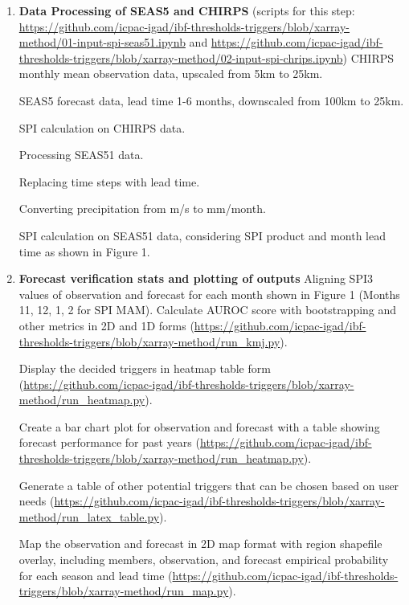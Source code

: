 \begin{enumerate}
	
	\item \textbf{Data Processing of SEAS5 and CHIRPS} (scripts for this step: \url{https://github.com/icpac-igad/ibf-thresholds-triggers/blob/xarray-method/01-input-spi-seas51.ipynb} and \url{https://github.com/icpac-igad/ibf-thresholds-triggers/blob/xarray-method/02-input-spi-chrips.ipynb})
	\subitem CHIRPS monthly mean observation data, upscaled from 5km to 25km. 
	
	\subitem SEAS5 forecast data, lead time 1-6 months, downscaled from 100km to 25km. 
	
	\subitem SPI calculation on CHIRPS data. 
	
	\subitem Processing SEAS51 data. 
	
	\subitem Replacing time steps with lead time. 
	
	\subitem Converting precipitation from m/s to mm/month. 
	
	\subitem SPI calculation on SEAS51 data, considering SPI product and month lead time as shown in Figure 1.
	
	\item \textbf{Forecast verification stats and plotting of outputs} 
	\subitem Aligning SPI3 values of observation and forecast for each month shown in Figure 1 (Months 11, 12, 1, 2 for SPI MAM). Calculate AUROC score with bootstrapping and other metrics in 2D and 1D forms (\url{https://github.com/icpac-igad/ibf-thresholds-triggers/blob/xarray-method/run_kmj.py}).
	
	\subitem Display the decided triggers in heatmap table form (\url{https://github.com/icpac-igad/ibf-thresholds-triggers/blob/xarray-method/run_heatmap.py}). 
	
	\subitem Create a bar chart plot for observation and forecast with a table showing forecast performance for past years (\url{https://github.com/icpac-igad/ibf-thresholds-triggers/blob/xarray-method/run_heatmap.py}). 
	
	\subitem Generate a table of other potential triggers that can be chosen based on user needs (\url{https://github.com/icpac-igad/ibf-thresholds-triggers/blob/xarray-method/run_latex_table.py}).
	
	\subitem Map the observation and forecast in 2D map format with region shapefile overlay, including members, observation, and forecast empirical probability for each season and lead time (\url{https://github.com/icpac-igad/ibf-thresholds-triggers/blob/xarray-method/run_map.py}).
	
\end{enumerate}






